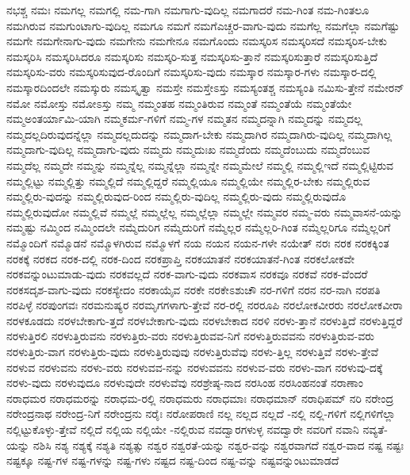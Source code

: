 {ನಭಶ್ಚ
ನಮಃ
ನಮಗಲ್ಲ
ನಮಗಲ್ಲಿ
ನಮ-ಗಾಗಿ
ನಮಗಾಗು-ವುದಿಲ್ಲ
ನಮಗಾದರೆ
ನಮ-ಗಿಂತ
ನಮ-ಗಿಂತಲೂ
ನಮಗಿರುವ
ನಮಗುಂಟಾಗು-ವುದಿಲ್ಲ
ನಮಗೂ
ನಮಗೆ
ನಮಗೆಎಚ್ಚರ-ವಾಗು-ವುದು
ನಮಗೆಲ್ಲ
ನಮಗೆಲ್ಲಾ
ನಮಗೆಷ್ಟು
ನಮಗೇ
ನಮಗೇನಾಗು-ವುದು
ನಮಗೇನು
ನಮಗೇನೂ
ನಮಗೊಂದು
ನಮಸ್ಕರಿಸ
ನಮಸ್ಕರಿಸದೆ
ನಮಸ್ಕರಿಸ-ಬೇಕು
ನಮಸ್ಕರಿಸಿ
ನಮಸ್ಕರಿಸಿದರೂ
ನಮಸ್ಕರಿಸು
ನಮಸ್ಕರಿ-ಸುತ್ತ
ನಮಸ್ಕರಿಸು-ತ್ತಾನೆ
ನಮಸ್ಕರಿಸುತ್ತಾರೆ
ನಮಸ್ಕರಿಸುತ್ತಿದೆ
ನಮಸ್ಕರಿಸು-ವರು
ನಮಸ್ಕರಿಸುವುದ-ರೊಂದಿಗೆ
ನಮಸ್ಕರಿಸು-ವುದು
ನಮಸ್ಕಾರ
ನಮಸ್ಕಾರ-ಗಳು
ನಮಸ್ಕಾರ-ದಲ್ಲಿ
ನಮಸ್ಕಾರದಿಂದಲೇ
ನಮಸ್ಕುರು
ನಮಸ್ಕೃತ್ವಾ
ನಮಸ್ತೇ
ನಮಸ್ತೇಽಸ್ತು
ನಮಸ್ಯಂತಶ್ಚ
ನಮಸ್ಯಂತಿ
ನಮಿಸು-ತ್ತೇನೆ
ನಮೇರನ್
ನಮೋ
ನಮೋಸ್ತು
ನಮೋಽಸ್ತು
ನಮ್ಮ
ನಮ್ಮಂತಹ
ನಮ್ಮಂತಿರುವ
ನಮ್ಮಂತೆ
ನಮ್ಮಂತೆಯೆ
ನಮ್ಮಂತೆಯೇ
ನಮ್ಮಅಂತರ್ಯಾಮಿ-ಯಾಗಿ
ನಮ್ಮಕರ್ಮ-ಗಳಿಗೆ
ನಮ್ಮ-ಗಳ
ನಮ್ಮತನ
ನಮ್ಮದನ್ನಾಗಿ
ನಮ್ಮದನ್ನು
ನಮ್ಮದಲ್ಲ
ನಮ್ಮದಲ್ಲದಿರುವುದನ್ನೆಲ್ಲಾ
ನಮ್ಮದಲ್ಲದುದನ್ನು
ನಮ್ಮದಾಗ-ಬೇಕು
ನಮ್ಮದಾಗಿರ
ನಮ್ಮದಾಗಿರು-ವುದಿಲ್ಲ
ನಮ್ಮದಾಗಿಲ್ಲ
ನಮ್ಮದಾಗು-ವುದಿಲ್ಲ
ನಮ್ಮದಾಗು-ವುದು
ನಮ್ಮದು
ನಮ್ಮದುಃಖ
ನಮ್ಮದೆಂದು
ನಮ್ಮದೆಂಬುದು
ನಮ್ಮದೆಂಬುವ
ನಮ್ಮದೆಲ್ಲ
ನಮ್ಮದೇ
ನಮ್ಮನ್ನು
ನಮ್ಮನ್ನೆಲ್ಲ
ನಮ್ಮನ್ನೆಲ್ಲಾ
ನಮ್ಮನ್ನೇ
ನಮ್ಮಮೇಲೆ
ನಮ್ಮಲ್ಲಿ
ನಮ್ಮಲ್ಲಿಇದೆ
ನಮ್ಮಲ್ಲಿಟ್ಟಿರುವ
ನಮ್ಮಲ್ಲಿಟ್ಟು
ನಮ್ಮಲ್ಲಿತ್ತು
ನಮ್ಮಲ್ಲಿದೆ
ನಮ್ಮಲ್ಲಿದ್ದರೆ
ನಮ್ಮಲ್ಲಿಯೂ
ನಮ್ಮಲ್ಲಿಯೇ
ನಮ್ಮಲ್ಲಿರ-ಬೇಕು
ನಮ್ಮಲ್ಲಿರುವ
ನಮ್ಮಲ್ಲಿರು-ವುದನ್ನು
ನಮ್ಮಲ್ಲಿರುವುದ-ರಿಂದ
ನಮ್ಮಲ್ಲಿರು-ವುದಿಲ್ಲ
ನಮ್ಮಲ್ಲಿರು-ವುದು
ನಮ್ಮಲ್ಲಿರುವುದೊ
ನಮ್ಮಲ್ಲಿರುವುದೋ
ನಮ್ಮಲ್ಲಿವೆ
ನಮ್ಮಲ್ಲೆ
ನಮ್ಮಲ್ಲೆಲ್ಲ
ನಮ್ಮಲ್ಲೆಲ್ಲಾ
ನಮ್ಮಲ್ಲೇ
ನಮ್ಮವರ
ನಮ್ಮ-ವರು
ನಮ್ಮವಾಸನೆ-ಯನ್ನು
ನಮ್ಮಷ್ಟು
ನಮ್ಮಿಂದ
ನಮ್ಮಿಂದಲೇ
ನಮ್ಮೆದುರಿಗ
ನಮ್ಮೆದುರಿಗೆ
ನಮ್ಮೆಲ್ಲರ
ನಮ್ಮೆಲ್ಲರಿ-ಗಿಂತ
ನಮ್ಮೆಲ್ಲರಿಗೂ
ನಮ್ಮೆಲ್ಲರಿಗೆ
ನಮ್ಮೊಂದಿಗೆ
ನಮ್ಮೊಡನೆ
ನಮ್ಮೊಳಗಿರುವ
ನಮ್ಮೊಳಗೆ
ನಯ
ನಯನ
ನಯನ-ಗಳೇ
ನಯೇತ್
ನರಃ
ನರಕ
ನರಕಕ್ಕಿಂತ
ನರಕಕ್ಕೆ
ನರಕದ
ನರಕ-ದಲ್ಲಿ
ನರಕ-ದಿಂದ
ನರಕಪ್ರಾಪ್ತಿ
ನರಕಯಾತನೆ
ನರಕಯಾತನೆ-ಗಿಂತ
ನರಕಲೋಕವೇ
ನರಕವನ್ನುಂಟುಮಾಡು-ವುದು
ನರಕವಲ್ಲದೆ
ನರಕ-ವಾಗು-ವುದು
ನರಕವಾಸ
ನರಕವೂ
ನರಕವೆ
ನರಕ-ವೆಂದರೆ
ನರಕಸದೃಶ-ವಾಗು-ವುದು
ನರಕಸ್ಯೇದಂ
ನರಕಾಯೈವ
ನರಕೇ
ನರಕೇಽಶುಚೌ
ನರ-ಗಳಿಗೆ
ನರನ
ನರ-ನಾಗಿ
ನರಪತಿ
ನರಪಿಳ್ಳೆ
ನರಪುಂಗವಃ
ನರಮನುಷ್ಯರ
ನರಮೃಗಗಳಾಗು-ತ್ತೇವೆ
ನರ-ರಲ್ಲಿ
ನರರೂಪಿ
ನರಲೋಕವೀರರು
ನರಲೋಕವೀರಾ
ನರಳಕೂಡದು
ನರಳಬೇಕಾಗು-ತ್ತದೆ
ನರಳಬೇಕಾಗು-ವುದು
ನರಳಬೇಕಾದ
ನರಳಿ
ನರಳು-ತ್ತಾನೆ
ನರಳುತ್ತಿದೆ
ನರಳುತ್ತಿದ್ದರೆ
ನರಳುತ್ತಿರಲಿ
ನರಳುತ್ತಿರುವನು
ನರಳುತ್ತಿರು-ವರು
ನರಳುತ್ತಿರುವವ-ನಿಗೆ
ನರಳುತ್ತಿರುವವನು
ನರಳುತ್ತಿರುವ-ವರು
ನರಳುತ್ತಿರು-ವಾಗ
ನರಳುತ್ತಿರು-ವುದು
ನರಳುತ್ತಿರುವುವು
ನರಳುತ್ತಿರುವೆವು
ನರಳು-ತ್ತಿಲ್ಲ
ನರಳುತ್ತಿವೆ
ನರಳು-ತ್ತೇವೆ
ನರಳುವ
ನರಳುವನು
ನರಳು-ವರು
ನರಳುವವ-ನನ್ನು
ನರಳುವವನು
ನರಳುವ-ವರು
ನರಳು-ವಾಗ
ನರಳುವು-ದಕ್ಕೆ
ನರಳು-ವುದು
ನರಳುವುದೂ
ನರಳುವುದೇ
ನರಳುವೆವು
ನರಶ್ರೇಷ್ಠ-ನಾದ
ನರಸಿಂಹ
ನರಸಿಂಹನಂತೆ
ನರಾಣಾಂ
ನರಾಧಮರ
ನರಾಧಮರನ್ನು
ನರಾಧಮ-ರಲ್ಲಿ
ನರಾಧಮರು
ನರಾಧಮಾಃ
ನರಾಧಮಾನ್
ನರಾಧಿಪಮ್
ನರಿ
ನರೇಂದ್ರ
ನರೇಂದ್ರನಾಥ
ನರೇಂದ್ರ-ನಿಗೆ
ನರೇಂದ್ರನು
ನರೈಃ
ನರೋಪರಾಣಿ
ನಲ್ಲ
ನಲ್ಲದ
ನಲ್ಲದೆ
-ನಲ್ಲಿ
ನಲ್ಲಿ-ಗಳಿಗೆ
ನಲ್ಲಿಗಳಿಗೆಲ್ಲಾ
ನಲ್ಲಿಟ್ಟುಕೊಳ್ಳು-ತ್ತೇವೆ
ನಲ್ಲಿದೆ
ನಲ್ಲಿಯ
ನಲ್ಲಿಯೇ
-ನಲ್ಲಿರುವ
ನವದ್ವಾರಗಳುಳ್ಳ
ನವದ್ವಾರೇ
ನವರಿಗೆ
ನವಾನಿ
ನವ್ಯತೆ-ಯನ್ನು
ನಶಿಸಿ
ನಶ್ಯ
ನಶ್ಯಕ್ಕೆ
ನಶ್ಯತಿ
ನಶ್ಯತ್ಸು
ನಶ್ವರ
ನಶ್ವರತೆ-ಯನ್ನು
ನಶ್ವರ-ವನ್ನು
ನಶ್ವರವಾಗದೆ
ನಶ್ವರ-ವಾದ
ನಷ್ಟ
ನಷ್ಟಃ
ನಷ್ಟಕ್ಕೂ
ನಷ್ಟ-ಗಳ
ನಷ್ಟ-ಗಳನ್ನು
ನಷ್ಟ-ಗಳು
ನಷ್ಟದ
ನಷ್ಟ-ದಿಂದ
ನಷ್ಟ-ವನ್ನು
ನಷ್ಟವನ್ನುಂಟುಮಾಡದೆ
}
